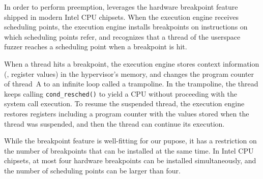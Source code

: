 






%
In order to perform preemption, \sys leverages the hardware breakpoint
feature~\cite{hwbp} shipped in modern Intel CPU chipsets.
%
When the execution engine receives scheduling points, the execution
engine installs breakpoints on instructions on which scheduling points
refer, and recognizes that a thread of the userspace fuzzer reaches a
scheduling point when a breakpoint is hit.


When a thread hits a breakpoint, the execution engine stores context
information (\eg, register values) in the hypervisor's memory, and
changes the program counter of thread~A to an infinite loop called a
trampoline.
%
In the trampoline, the thread keeps calling \texttt{cond_resched()} to
yield a CPU without proceeding with the system call execution.
%
To resume the suspended thread, the execution engine restores
registers including a program counter with the values stored when the
thread was suspended, and then the thread can continue its execution.






%
While the breakpoint feature is well-fitting for our pupose, it has a
restriction on the number of breakpoints that can be installed at the
same time.
%
In Intel CPU chipsets, at most four hardware breakpoints can be
installed simultaneously, and the number of scheduling points can be
larger than four.

